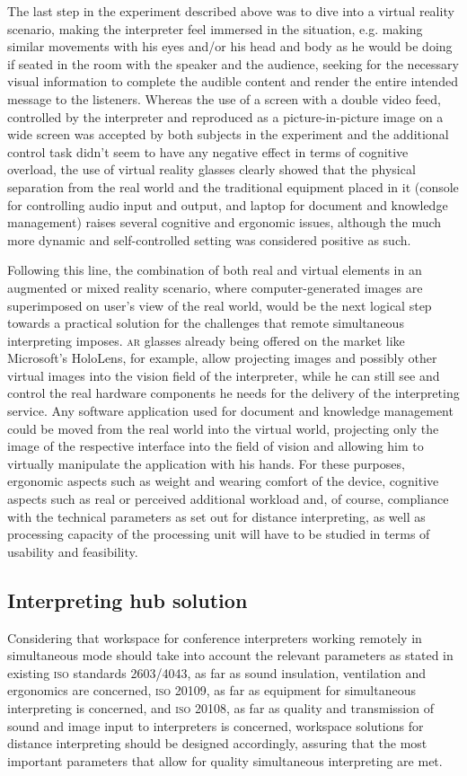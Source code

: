 \documentclass[output=paper]{langsci/langscibook}
\begin{document}
The last step in the experiment described above was to dive into a virtual reality scenario, making the interpreter feel immersed in the situation, e.g. making similar movements with his eyes and/or his head and body as he would be doing if seated in the room with the speaker and the audience, seeking for the necessary visual information to complete the audible content and render the entire intended message to the listeners. Whereas the use of a screen with a double video feed, controlled by the interpreter and reproduced as a picture-in-picture image on a wide screen was accepted by both subjects in the experiment and the additional control task didn’t seem to have any negative effect in terms of cognitive overload, the use of virtual reality glasses clearly showed that the physical separation from the real world and the traditional equipment placed in it (console for controlling audio input and output, and laptop for document and knowledge management) raises several cognitive and ergonomic issues, although the much more dynamic and self-controlled setting was considered positive as such. 

Following this line, the combination of both real and virtual elements in an augmented or mixed reality scenario, where computer-generated images are superimposed on user’s view of the real world, would be the next logical step towards a practical solution for the challenges that remote simultaneous interpreting imposes. \textsc{ar} glasses already being offered on the market like Microsoft’s HoloLens, for example, allow projecting images and possibly other virtual images into the vision field of the interpreter, while he can still see and control the real hardware components he needs for the delivery of the interpreting service. Any software application used for document and knowledge management could be moved from the real world into the virtual world, projecting only the image of the respective interface into the field of vision and allowing him to virtually manipulate the application with his hands. For these purposes, ergonomic aspects such as weight and wearing comfort of the device, cognitive aspects such as real or perceived additional workload and, of course, compliance with the technical parameters as set out for distance interpreting, as well as processing capacity of the processing unit will have to be studied in terms of usability and feasibility.

\subsection{Interpreting hub solution}
\label{sub:ziegler:6.2}
Considering that workspace for conference interpreters working remotely in simultaneous mode should take into account the relevant parameters as stated in existing \textsc{iso} standards 2603/4043, as far as sound insulation, ventilation and ergonomics are concerned, \textsc{iso} 20109, as far as equipment for simultaneous interpreting is concerned, and \textsc{iso} 20108, as far as quality and transmission of sound and image input to interpreters is concerned, workspace solutions for distance interpreting should be designed accordingly, assuring that the most important parameters that allow for quality simultaneous interpreting are met.
\end{document}
